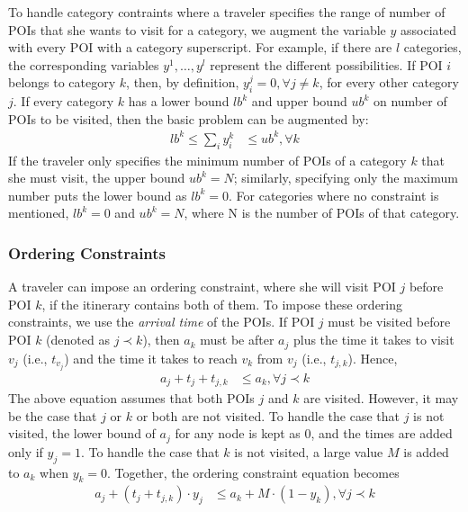 To handle category contraints where a traveler specifies the range of
number of POIs that she wants to visit for a category, we augment the
variable $y$ associated with every POI with a category superscript.  For
example, if there are $l$ categories, the corresponding variables $y^1,
\dots, y^l$ represent the different possibilities.  If POI $i$ belongs to
category $k$, then, by definition, $y^j_i = 0, \forall j \neq k$, for
every other category $j$.  If every category $k$ has a lower bound $lb^k$
and upper bound $ub^k$ on number of POIs to be visited, then the basic
problem can be augmented by:
%
\begin{align}
	\label{eq:category}
	lb^k \leq \sum_{i} y^k_i & \leq ub^k, \forall k
\end{align}
%
If the traveler only specifies the minimum number of POIs of a category
$k$ that she must visit, the upper bound $ub^k = N$; similarly, specifying
only the maximum number puts the lower bound as $lb^k = 0$.  For
categories where no constraint is mentioned, $lb^k = 0$ and $ub^k = N$, where N is the number of POIs of that category.

\subsubsection{\textbf{Ordering Constraints}}
\label{sec:ordering}

A traveler can impose an ordering constraint, where she will visit POI $j$ before POI $k$, if the itinerary contains both of them.
To impose these ordering constraints, we use the \emph{arrival time} of the POIs.
If POI $j$ must be visited before POI $k$ (denoted as $j \prec k$), then $a_k$ must be after $a_j$ plus
the time it takes to visit $v_j$ (i.e., $t_{v_j}$) and the time it takes to
reach $v_k$ from $v_j$ (i.e., $t_{j,k}$).
Hence,
%
\begin{align}
	a_j + t_{j} + t_{j,k} & \leq a_k, \forall j \prec k
\end{align}
%
The above equation assumes that both POIs $j$ and $k$ are visited.
However, it may be the case that $j$ or $k$ or both are not visited.
To handle the case that $j$ is not visited, the lower bound of $a_j$ for any
node is kept as $0$, and the times are added only if $y_j = 1$.
To handle the case that $k$ is not visited, a large value $M$ is added to $a_k$
when $y_k = 0$.
Together, the ordering constraint equation becomes
%
\begin{align}
	\label{eq:ordering}
	a_j + (t_{j} + t_{j,k}) \cdot y_j & \leq a_k + M \cdot (1 - y_k), \forall j \prec k
\end{align}


